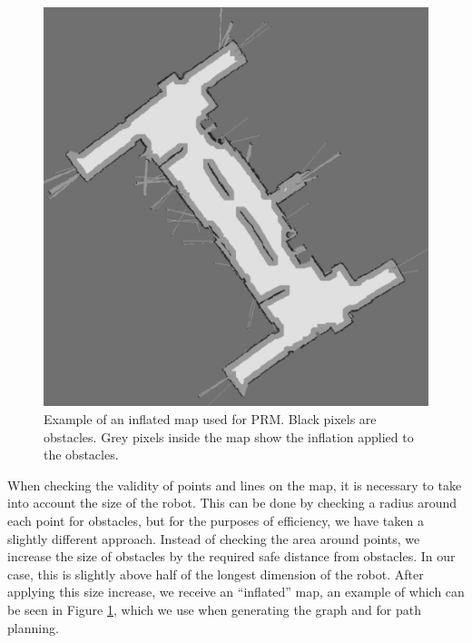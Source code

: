 \documentclass[conference]{IEEEtran}
\begin{document}
\begin{figure}
  \centering
  \includegraphics[width=\columnwidth]{inflated-map}
  \caption{Example of an inflated map used for PRM. Black pixels are obstacles. Grey pixels inside the map show the inflation applied to the obstacles.}
  \label{fig:inflatedmap}
\end{figure}
When checking the validity of points and lines on the map, it is necessary to take into account the size of the robot. This can be done by checking a radius around each point for obstacles, but for the purposes of efficiency, we have taken a slightly different approach. Instead of checking the area around points, we increase the size of obstacles by the required safe distance from obstacles. In our case, this is slightly above half of the longest dimension of the robot. After applying this size increase, we receive an ``inflated'' map, an example of which can be seen in Figure \ref{fig:inflatedmap}, which we use when generating the graph and for path planning.
\end{document}
